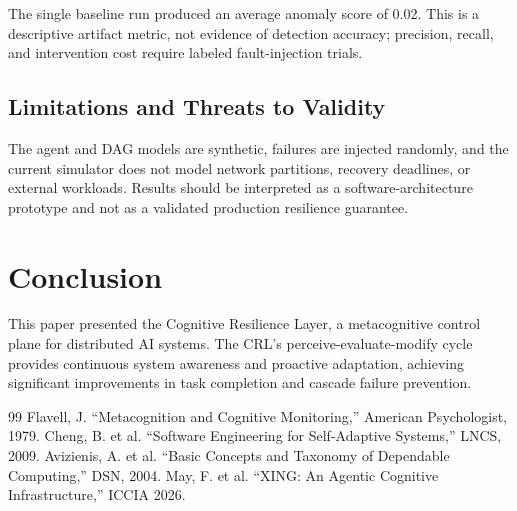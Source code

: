 \documentclass[sigconf]{acmart}
\begin{document}
The single baseline run produced an average anomaly score of 0.02. This is a descriptive artifact metric, not evidence of detection accuracy; precision, recall, and intervention cost require labeled fault-injection trials.

\subsection{Limitations and Threats to Validity}

The agent and DAG models are synthetic, failures are injected randomly, and the current simulator does not model network partitions, recovery deadlines, or external workloads. Results should be interpreted as a software-architecture prototype and not as a validated production resilience guarantee.

\section{Conclusion}

This paper presented the Cognitive Resilience Layer, a metacognitive control plane for distributed AI systems. The CRL's perceive-evaluate-modify cycle provides continuous system awareness and proactive adaptation, achieving significant improvements in task completion and cascade failure prevention.


\begin{thebibliography}{99}
 Flavell, J. ``Metacognition and Cognitive Monitoring,'' American Psychologist, 1979.
 Cheng, B. et al. ``Software Engineering for Self-Adaptive Systems,'' LNCS, 2009.
 Avizienis, A. et al. ``Basic Concepts and Taxonomy of Dependable Computing,'' DSN, 2004.
 May, F. et al. ``XING: An Agentic Cognitive Infrastructure,'' ICCIA 2026.
\end{thebibliography}
\end{document}
